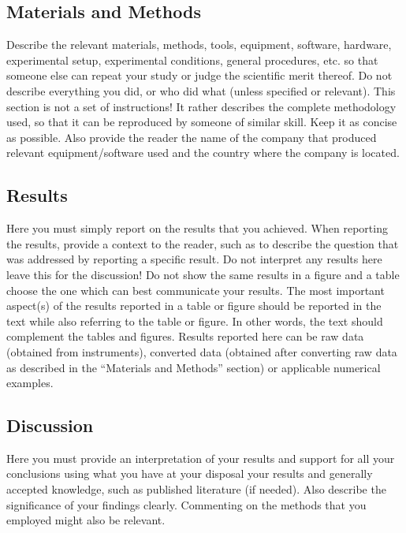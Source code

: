 \documentclass[12pt,a4paper]{article}
\begin{document}
\subsection{Materials and Methods}
\label{sec:MaterialsAndMethods}

Describe the relevant materials, methods, tools, equipment, software,
hardware, experimental setup, experimental conditions, general procedures,
etc. so that someone else can repeat your study or judge the scientific
merit thereof. Do not describe everything you did, or who did what
(unless specified or relevant). This section is not a set of instructions! It rather describes the complete methodology used, so that it can be reproduced by someone of similar skill.
Keep it as concise as possible. Also provide the reader the name of
the company that produced relevant equipment/software
used and the country where the company is located.

\subsection{Results}
\label{sec:Results}

Here you must simply report on the results that you achieved. When
reporting the results, provide a context to the reader, such as to
describe the question that was addressed by reporting a specific result.
Do not interpret any results here \textendash{} leave this for the
discussion! Do not show the same results in a figure and a table \textendash{}
choose the one which can best communicate your results. The most important
aspect(s) of the results reported in a table or figure should be reported
in the text while also referring to the table or figure. In other
words, the text should complement the tables and figures. Results
reported here can be raw data (obtained from instruments), converted
data (obtained after converting raw data as described in the \textquotedblleft{}Materials
and Methods\textquotedblright{} section) or applicable numerical examples.


\subsection{Discussion}
\label{sec:Discussion}

Here you must provide an interpretation of your results and support
for all your conclusions using what you have at your disposal \textendash{}
your results and generally accepted knowledge, such as published literature
(if needed). Also describe the significance of your findings clearly.
Commenting on the methods that you employed might also be relevant. 
\end{document}
